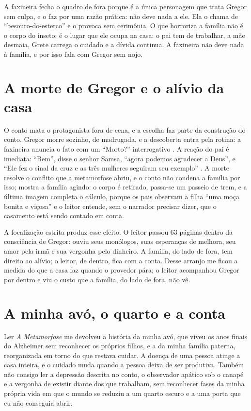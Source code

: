 \documentclass[12pt]{article}
\begin{document}
A faxineira fecha o quadro de fora porque é a única personagem que trata Gregor sem culpa, e o faz por uma razão prática: não deve nada a ele. Ela o chama de ``besouro-do-esterco'' \cite[p. 76]{kafka2022} e o provoca sem cerimônia. O que horroriza a família não é o corpo do inseto; é o lugar que ele ocupa na casa: o pai tem de trabalhar, a mãe desmaia, Grete carrega o cuidado e a dívida continua. A faxineira não deve nada à família, e por isso fala com Gregor sem nojo.

\section{A morte de Gregor e o alívio da casa}

O conto mata o protagonista fora de cena, e a escolha faz parte da construção do conto. Gregor morre sozinho, de madrugada, e a descoberta entra pela rotina: a faxineira anuncia o fato com um ``Morto?'' interrogativo \cite[p. 93]{kafka2022}. A reação do pai é imediata: ``Bem'', disse o senhor Samsa, ``agora podemos agradecer a Deus'', e ``Ele fez o sinal da cruz e as três mulheres seguiram seu exemplo'' \cite[p. 93]{kafka2022}. A morte resolve o conflito que a metamorfose abriu, e o conto não condena a família por isso; mostra a família agindo: o corpo é retirado, passa-se um passeio de trem, e a última imagem completa o cálculo, porque os pais observam a filha ``uma moça bonita e viçosa'' \cite[p. 98]{kafka2022} e o leitor entende, sem o narrador precisar dizer, que o casamento está sendo contado em conta.

A focalização estrita produz esse efeito. O leitor passou 63 páginas dentro da consciência de Gregor: ouviu seus monólogos, suas esperanças de melhora, seu amor pela irmã e sua vergonha pelo dinheiro. A família, do lado de fora, tem direito ao alívio; o leitor, de dentro, fica com a conta. Desse arranjo me ficou a medida do que a casa faz quando o provedor pára; o leitor acompanhou Gregor por dentro e viu o custo que a família, do lado de fora, não vê.

\section{A minha avó, o quarto e a conta}

Ler \emph{A Metamorfose} me devolveu a história da minha avó, que viveu os anos finais do Alzheimer sem reconhecer os próprios filhos, e a da minha família paterna, reorganizada em torno do que restava cuidar. A doença de uma pessoa atinge a casa inteira, e o cuidado muda quando a pessoa deixa de ser produtiva. Também não consigo ler a depressão descrita no conto, o observador apático sob o canapé e a vergonha de existir diante dos que trabalham, sem reconhecer fases da minha própria vida em que o mundo se reduziu a um quarto escuro e a uma porta que eu não conseguia abrir.
\end{document}
